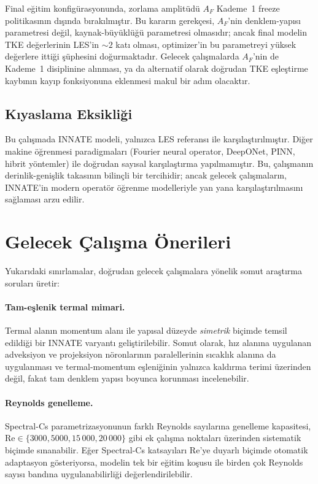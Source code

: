 Final eğitim konfigürasyonunda, zorlama amplitüdü $A_{F}$ Kademe~1 freeze politikasının dışında bırakılmıştır. Bu kararın gerekçesi, $A_{F}$'nin denklem-yapısı parametresi değil, kaynak-büyüklüğü parametresi olmasıdır; ancak final modelin TKE değerlerinin LES'in $\sim 2$ katı olması, optimizer'in bu parametreyi yüksek değerlere ittiği şüphesini doğurmaktadır. Gelecek çalışmalarda $A_{F}$'nin de Kademe~1 disiplinine alınması, ya da alternatif olarak doğrudan TKE eşleştirme kaybının kayıp fonksiyonuna eklenmesi makul bir adım olacaktır.

\subsection{Kıyaslama Eksikliği}

Bu çalışmada INNATE modeli, yalnızca LES referansı ile karşılaştırılmıştır. Diğer makine öğrenmesi paradigmaları (Fourier neural operator, DeepONet, PINN, hibrit yöntemler) ile doğrudan sayısal karşılaştırma yapılmamıştır. Bu, çalışmanın derinlik-genişlik takasının bilinçli bir tercihidir; ancak gelecek çalışmaların, INNATE'in modern operatör öğrenme modelleriyle yan yana karşılaştırılmasını sağlaması arzu edilir.

\section{Gelecek Çalışma Önerileri}

Yukarıdaki sınırlamalar, doğrudan gelecek çalışmalara yönelik somut araştırma soruları üretir:

\paragraph{Tam-eşlenik termal mimari.} Termal alanın momentum alanı ile yapısal düzeyde \emph{simetrik} biçimde temsil edildiği bir INNATE varyantı geliştirilebilir. Somut olarak, hız alanına uygulanan adveksiyon ve projeksiyon nöronlarının paralellerinin sıcaklık alanına da uygulanması ve termal-momentum eşleniğinin yalnızca kaldırma terimi üzerinden değil, fakat tam denklem yapısı boyunca korunması incelenebilir.

\paragraph{Reynolds genelleme.} Spectral-Cs parametrizasyonunun farklı Reynolds sayılarına genelleme kapasitesi, $\mathrm{Re}\in\{3000, 5000, 15\,000, 20\,000\}$ gibi ek çalışma noktaları üzerinden sistematik biçimde sınanabilir. Eğer Spectral-Cs katsayıları $\mathrm{Re}$'ye duyarlı biçimde otomatik adaptasyon gösteriyorsa, modelin tek bir eğitim koşusu ile birden çok Reynolds sayısı bandına uygulanabilirliği değerlendirilebilir.

